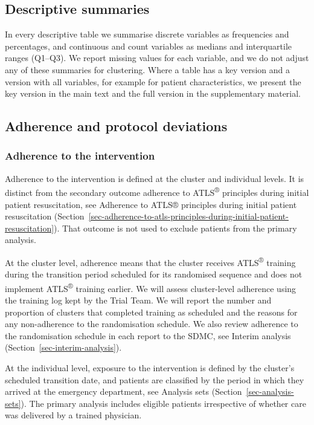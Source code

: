 \documentclass[
]{scrartcl}
\begin{document}
\subsection{Descriptive summaries}\label{sec-descriptive-summaries}

In every descriptive table we summarise discrete variables as
frequencies and percentages, and continuous and count variables as
medians and interquartile ranges (Q1--Q3). We report missing values for
each variable, and we do not adjust any of these summaries for
clustering. Where a table has a key version and a version with all
variables, for example for patient characteristics, we present the key
version in the main text and the full version in the supplementary
material.

\subsection{Adherence and protocol
deviations}\label{sec-adherence-and-protocol-deviations}

\subsubsection{Adherence to the
intervention}\label{sec-adherence-to-the-intervention}

Adherence to the intervention is defined at the cluster and individual
levels. It is distinct from the secondary outcome adherence to
ATLS\textsuperscript{®} principles during initial patient resuscitation,
see Adherence to ATLS® principles during initial patient resuscitation
(Section~\ref{sec-adherence-to-atls-principles-during-initial-patient-resuscitation}).
That outcome is not used to exclude patients from the primary analysis.

At the cluster level, adherence means that the cluster receives
ATLS\textsuperscript{®} training during the transition period scheduled
for its randomised sequence and does not implement
ATLS\textsuperscript{®} training earlier. We will assess cluster-level
adherence using the training log kept by the Trial Team. We will report
the number and proportion of clusters that completed training as
scheduled and the reasons for any non-adherence to the randomisation
schedule. We also review adherence to the randomisation schedule in each
report to the SDMC, see Interim analysis
(Section~\ref{sec-interim-analysis}).

At the individual level, exposure to the intervention is defined by the
cluster's scheduled transition date, and patients are classified by the
period in which they arrived at the emergency department, see
Analysis sets (Section~\ref{sec-analysis-sets}). The primary analysis
includes eligible patients irrespective of whether care was delivered by
a trained physician.
\end{document}

